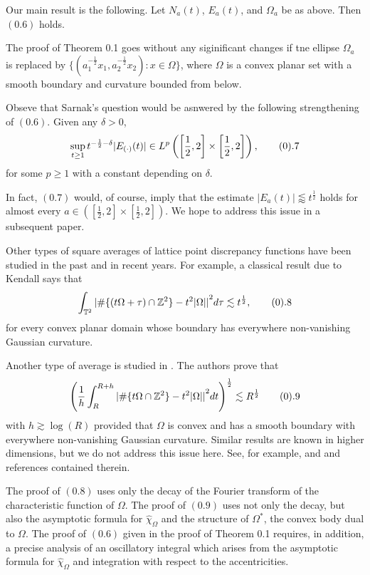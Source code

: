 Our main result is the following.  Let
$N_a(t)$, $E_a(t)$, and $\Omega_a$ be  as above. Then $(0.6)$
holds. \endproclaim

 The proof of Theorem 0.1 goes  without any siginificant
changes if tne ellipse $\Omega_a$ is replaced by
$\{(a_1^{-\frac{1}{2}}x_1, a_2^{-\frac{1}{2}}x_2): x \in \Omega\}$, where
$\Omega$ is a convex planar set with a smooth boundary and curvature
bounded from below. \endremark

Obseve that Sarnak's question would be asnwered by the following
strengthening of $(0.6)$.
  Given any $\delta>0$,
$$ \sup_{t \ge 1} t^{-\frac{1}{2}-\delta}|E_{(\cdot)}(t)| \in L^p
\left(\left[\frac{1}{2},2 \right] \times \left[\frac{1}{2},2 \right]
\right), \tag0.7$$ for some $p \ge 1$ with a constant depending on
$\delta$.
\endproclaim

In fact, $(0.7)$ would, of course, imply that the estimate $|E_a(t)|
\lessapprox t^{\frac{1}{2}}$ holds for almost every $a \in
\left(\left[\frac{1}{2},2 \right] \times \left[\frac{1}{2},2 \right]
\right)$. We hope to address this issue in a subsequent paper.

Other types of square averages of lattice point discrepancy functions
have been studied in the past and in recent years. For example, a
classical result due to Kendall says that
$$ \int_{{\Bbb T}^2} {|\# \{(t \Omega +\tau) \cap {\Bbb
Z}^2\}-t^2|\Omega||}^2 d\tau \lesssim t^{\frac{1}{2}}, \tag0.8$$
for every convex planar domain whose boundary has everywhere
non-vanishing Gaussian curvature.

Another type of average is studied in \cite{ISS02}. The authors prove
that
$$ {\left( \frac{1}{h} \int_R^{R+h} {|\# \{t \Omega \cap {\Bbb
Z}^2\}-t^2|\Omega||}^2 dt \right)}^{\frac{1}{2}} \lesssim R^{\frac{1}{2}}
\tag0.9$$ with $h \gtrsim \log(R)$ provided that $\Omega$ is convex and
has a smooth boundary with everywhere non-vanishing Gaussian curvature.
Similar results are known in higher dimensions, but we do not address
this issue here. See, for example, \cite{Huxley96} and \cite{ISS02} and
references contained therein.

The proof of $(0.8)$ uses only the decay of the Fourier transform of the
characteristic function of $\Omega$. The proof of $(0.9)$ uses not only
the decay, but also the asymptotic formula for $\widehat{\chi}_{\Omega}$
and the structure of $\Omega^{*}$, the convex body dual to $\Omega$. The
proof of $(0.6)$ given in the proof of Theorem 0.1 requires, in addition,
a precise analysis of an oscillatory integral which arises from the
asymptotic formula for $\widehat{\chi}_{\Omega}$ and integration with
respect to the accentricities.

